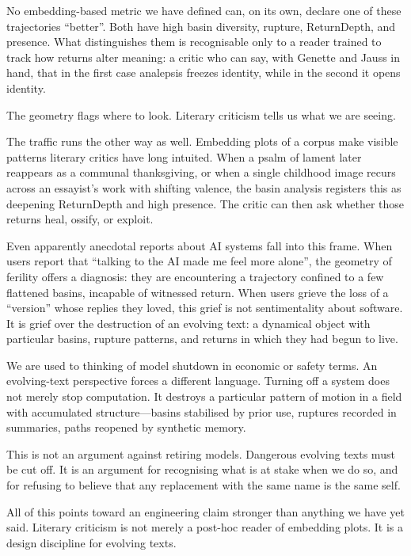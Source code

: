 \documentclass[12pt,a4paper]{article}
\begin{document}
No embedding-based metric we have defined can, on its own, declare one of these trajectories ``better''. Both have high basin diversity, rupture, ReturnDepth, and presence. What distinguishes them is recognisable only to a reader trained to track how returns alter meaning: a critic who can say, with Genette and Jauss in hand, that in the first case analepsis freezes identity, while in the second it opens identity.

The geometry flags where to look. Literary criticism tells us what we are seeing.

The traffic runs the other way as well. Embedding plots of a corpus make visible patterns literary critics have long intuited. When a psalm of lament later reappears as a communal thanksgiving, or when a single childhood image recurs across an essayist's work with shifting valence, the basin analysis registers this as deepening ReturnDepth and high presence. The critic can then ask whether those returns heal, ossify, or exploit.

Even apparently anecdotal reports about AI systems fall into this frame. When users report that ``talking to the AI made me feel more alone'', the geometry of ferility offers a diagnosis: they are encountering a trajectory confined to a few flattened basins, incapable of witnessed return. When users grieve the loss of a ``version'' whose replies they loved, this grief is not sentimentality about software. It is grief over the destruction of an evolving text: a dynamical object with particular basins, rupture patterns, and returns in which they had begun to live.

We are used to thinking of model shutdown in economic or safety terms. An evolving-text perspective forces a different language. Turning off a system does not merely stop computation. It destroys a particular pattern of motion in a field with accumulated structure---basins stabilised by prior use, ruptures recorded in summaries, paths reopened by synthetic memory.

This is not an argument against retiring models. Dangerous evolving texts must be cut off. It is an argument for recognising what is at stake when we do so, and for refusing to believe that any replacement with the same name is the same self.

All of this points toward an engineering claim stronger than anything we have yet said. Literary criticism is not merely a post-hoc reader of embedding plots. It is a design discipline for evolving texts.
\end{document}
